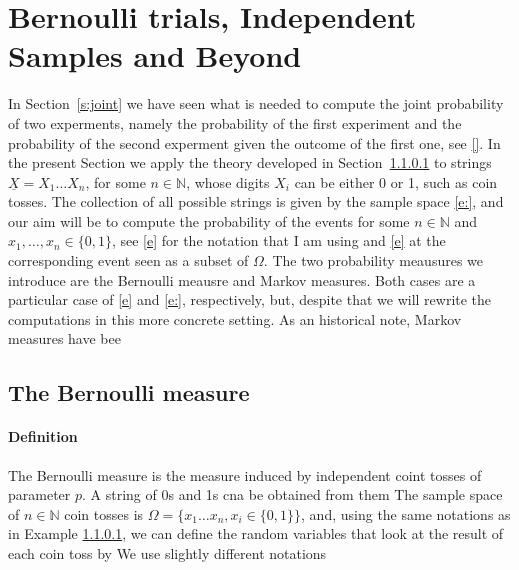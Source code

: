 
	\section{ Bernoulli trials, Independent Samples and Beyond }
	 \label{s:bernoulli_and_beyond}

	 In Section~\ref{s:joint} we have seen what is needed to compute the joint probability of two experments, namely the probability of the first experiment and the probability of the second experment given the outcome of the first one, see \eqref{}. In the present Section we apply the theory developed in Section~\ref{} to strings $\underline X = X_1\ldots X_n$, for some $n \in \mathbb N$,  whose digits $X_i$ can be either 0 or 1, such as coin tosses. The collection of all possible strings is given by the sample space \eqref{e:}, and our aim will be to compute the probability of the events 
	for some $n \in\mathbb N $ and $x_1, \ldots, x_n \in \{0,1\}$, see \eqref{e} for the notation that I am using and \eqref{e} at the corresponding event seen as a subset of $\Omega$. The two probability meausures we introduce are the Bernoulli meausre and Markov measures. Both cases are a particular case of \eqref{e} and \eqref{e:}, respectively, but, despite that we will rewrite the computations in this more concrete setting. As an historical note, Markov measures have bee  

 
\subsection{The Bernoulli measure}
	\label{ss:Bernoulli}
	\paragraph{ Definition }
	The Bernoulli measure is the measure induced by independent coint tosses of parameter $p$. A string of 0s and 1s cna be obtained from them  
	The sample space of $n \in \mathbb N $ coin tosses is $\Omega = \{x_1 \ldots x_n, x_i \in \{0,1\}\}$, and, using the same notations as in Example \ref{}, we can define the random variables that look at the result of each coin toss by
We use slightly different notations 

